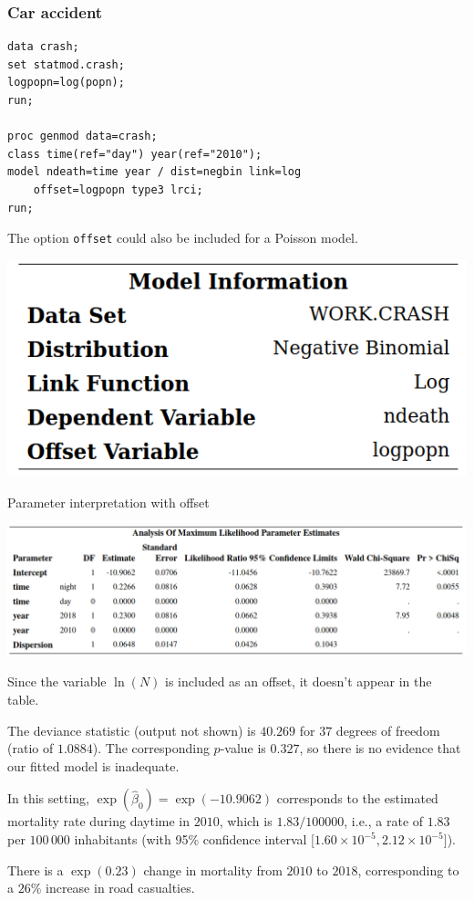 \documentclass{beamer}
\begin{document}
\begin{frame}[fragile]
\frametitle{Car accident}

\begin{tcolorbox}[colback=white, colframe=hecblue, title=\SASlang{} code to include an offset term]
{\small
\begin{verbatim}
data crash;
set statmod.crash;
logpopn=log(popn);
run;

proc genmod data=crash;
class time(ref="day") year(ref="2010");
model ndeath=time year / dist=negbin link=log 
    offset=logpopn type3 lrci;
run;
\end{verbatim}
}
\end{tcolorbox}
{\footnotesize 

The option \texttt{offset} could also be included for a Poisson model.



}
\begin{center}
 \includegraphics[width = 0.4\linewidth]{img/c4/slides8-e9}
\end{center}

\end{frame}
\begin{frame}{Parameter interpretation with offset}
\begin{center}
 \includegraphics[width = 0.99\linewidth]{img/c4/slides8-e10}
\end{center}
{\small 
\bi \item Since the variable $\ln(N)$ is included as an offset, it doesn't appear in the table.
\item The deviance statistic (output not shown) is $40.269$ for $37$ degrees of freedom (ratio of $1.0884$). The corresponding $p$-value is $0.327$, so there is no evidence that our fitted model is inadequate.
\item In this setting, $\exp(\hat{\beta}_0)=\exp(-10.9062)$ corresponds to the estimated mortality rate during daytime in $2010$, which is $1.83/100000$, i.e., a rate of $1.83$ per $100\,000$ inhabitants (with 95\% confidence interval [$1.60  \times 10^{-5}, 2.12 \times 10^{-5}]$).
\item There is a $\exp(0.23)$ change in mortality from $2010$ to $2018$, corresponding to a $26$\% increase in road casualties.
\ei
}
\end{frame}
\end{document}

